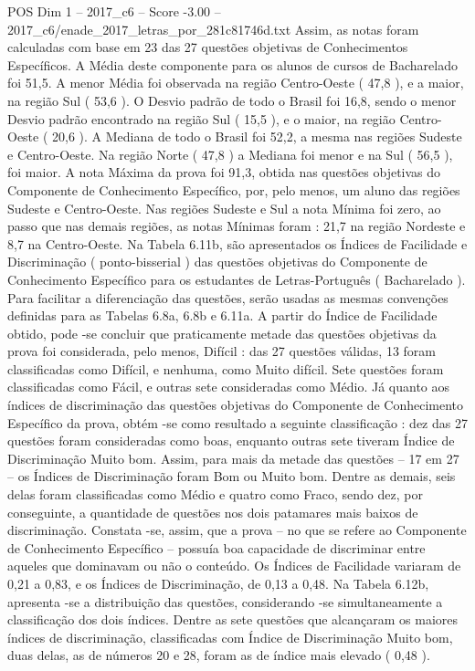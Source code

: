 \begin{textsample}{POS Dim 1 – 2017\_c6 – Score -3.00 – 2017\_c6/enade\_2017\_letras\_por\_281c81746d.txt}
Assim, as notas foram calculadas com base em 23 das 27 questões objetivas de Conhecimentos Específicos.
A Média deste componente para os alunos de cursos de Bacharelado foi 51,5.
A menor Média foi observada na região Centro-Oeste ( 47,8 ), e a maior, na região Sul ( 53,6 ).
O Desvio padrão de todo o Brasil foi 16,8, sendo o menor Desvio padrão encontrado na região Sul ( 15,5 ), e o maior, na região Centro-Oeste ( 20,6 ).
A Mediana de todo o Brasil foi 52,2, a mesma nas regiões Sudeste e Centro-Oeste.
Na região Norte ( 47,8 ) a Mediana foi menor e na Sul ( 56,5 ), foi maior.
A nota Máxima da prova foi 91,3, obtida nas questões objetivas do Componente de Conhecimento Específico, por, pelo menos, um aluno das regiões Sudeste e Centro-Oeste.
Nas regiões Sudeste e Sul a nota Mínima foi zero, ao passo que nas demais regiões, as notas Mínimas foram : 21,7 na região Nordeste e 8,7 na Centro-Oeste.
Na Tabela 6.11b, são apresentados os Índices de Facilidade e Discriminação ( ponto-bisserial ) das questões objetivas do Componente de Conhecimento Específico para os estudantes de Letras-Português ( Bacharelado ).
Para facilitar a diferenciação das questões, serão usadas as mesmas convenções definidas para as Tabelas 6.8a, 6.8b e 6.11a.
A partir do Índice de Facilidade obtido, pode -se concluir que praticamente metade das questões objetivas da prova foi considerada, pelo menos, Difícil : das 27 questões válidas, 13 foram classificadas como Difícil, e nenhuma, como Muito difícil.
Sete questões foram classificadas como Fácil, e outras sete consideradas como Médio.
Já quanto aos índices de discriminação das questões objetivas do Componente de Conhecimento Específico da prova, obtém -se como resultado a seguinte classificação : dez das 27 questões foram consideradas como boas, enquanto outras sete tiveram Índice de Discriminação Muito bom.
Assim, para mais da metade das questões – 17 em 27 – os Índices de Discriminação foram Bom ou Muito bom.
Dentre as demais, seis delas foram classificadas como Médio e quatro como Fraco, sendo dez, por conseguinte, a quantidade de questões nos dois patamares mais baixos de discriminação.
Constata -se, assim, que a prova – no que se refere ao Componente de Conhecimento Específico – possuía boa capacidade de discriminar entre aqueles que dominavam ou não o conteúdo.
Os Índices de Facilidade variaram de 0,21 a 0,83, e os Índices de Discriminação, de 0,13 a 0,48.
Na Tabela 6.12b, apresenta -se a distribuição das questões, considerando -se simultaneamente a classificação dos dois índices.
Dentre as sete questões que alcançaram os maiores índices de discriminação, classificadas com Índice de Discriminação Muito bom, duas delas, as de números 20 e 28, foram as de índice mais elevado ( 0,48 ).

\end{textsample}

